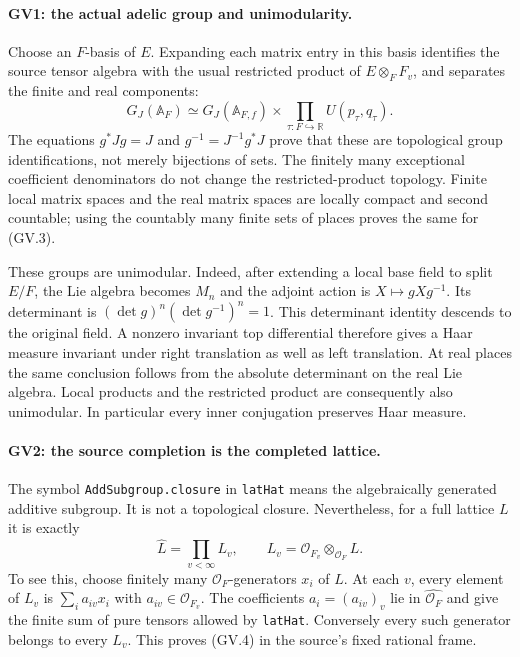 \paragraph{GV1: the actual adelic group and unimodularity.}
Choose an $F$-basis of $E$. Expanding each matrix entry in this basis
identifies the source tensor algebra with the usual restricted product
of $E\otimes_F F_v$, and separates the finite and real components:
\[
 G_J(\mathbb A_F)\simeq G_J(\mathbb A_{F,f})
                         \times\prod_{\tau:F\hookrightarrow\mathbb R}
                                      U(p_\tau,q_\tau).
 \tag{GV.3}
\]
The equations $g^*Jg=J$ and $g^{-1}=J^{-1}g^*J$ prove that these are
topological group identifications, not merely bijections of sets.
The finitely many exceptional coefficient denominators do not change
the restricted-product topology. Finite local matrix spaces and the
real matrix spaces are locally compact and second countable; using the
countably many finite sets of places proves the same for (GV.3).

These groups are unimodular. Indeed, after extending a local base field
to split $E/F$, the Lie algebra becomes $M_n$ and the adjoint action is
$X\mapsto gXg^{-1}$. Its determinant is
$(\det g)^n(\det g^{-1})^n=1$. This determinant identity descends to
the original field. A nonzero invariant top differential therefore
gives a Haar measure invariant under right translation as well as
left translation. At real places the same conclusion follows from
the absolute determinant on the real Lie algebra. Local products and
the restricted product are consequently also unimodular. In
particular every inner conjugation preserves Haar measure.

\paragraph{GV2: the source completion is the completed lattice.}
The symbol \texttt{AddSubgroup.closure} in \texttt{latHat} means the
algebraically generated additive subgroup. It is not a topological
closure. Nevertheless, for a full lattice $L$ it is exactly
\[
 \widehat L=\prod_{v<\infty}L_v,
 \qquad L_v=\mathcal O_{F_v}\otimes_{\mathcal O_F}L.
 \tag{GV.4}
\]
To see this, choose finitely many $\mathcal O_F$-generators $x_i$ of
$L$. At each $v$, every element of $L_v$ is $\sum_i a_{iv}x_i$ with
$a_{iv}\in\mathcal O_{F_v}$. The coefficients $a_i=(a_{iv})_v$ lie
in $\widehat{\mathcal O_F}$ and give the finite sum of pure tensors
allowed by \texttt{latHat}. Conversely every such generator belongs
to every $L_v$. This proves (GV.4) in the source's fixed rational frame.

